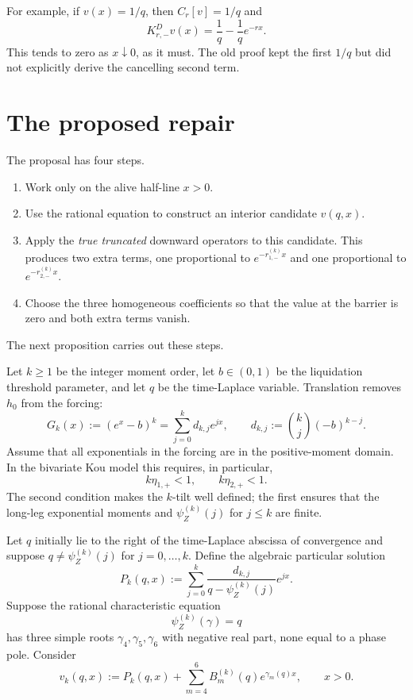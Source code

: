 \documentclass[11pt]{article}
\theoremstyle{plain}
\theoremstyle{remark}
\begin{document}
For example, if $v(x)=1/q$, then $C_r[v]=1/q$ and
\begin{equation}\label{eq:constant-truncated}
K_{r,-}^{D}v(x)=\frac1q-\frac1q e^{-rx}.
\end{equation}
This tends to zero as $x\downarrow0$, as it must.  The old proof kept the first
$1/q$ but did not explicitly derive the cancelling second term.

\section{The proposed repair}

The proposal has four steps.
\begin{enumerate}
\item Work only on the alive half-line $x>0$.
\item Use the rational equation to construct an interior candidate $v(q,x)$.
\item Apply the \emph{true truncated} downward operators to this candidate.
This produces two extra terms, one proportional to
$e^{-r_{1,-}^{(k)}x}$ and one proportional to
$e^{-r_{2,-}^{(k)}x}$.
\item Choose the three homogeneous coefficients so that the value at the
barrier is zero and both extra terms vanish.
\end{enumerate}

The next proposition carries out these steps.

Let $k\geq1$ be the integer moment order, let $b\in(0,1)$ be the liquidation
threshold parameter, and let $q$ be the time-Laplace variable.  Translation
removes $h_0$ from the forcing:
\[
G_k(x):=(e^x-b)^k
=\sum_{j=0}^k d_{k,j}e^{jx},
\qquad
d_{k,j}:=\binom{k}{j}(-b)^{k-j}.
\]
Assume that all exponentials in the forcing are in the positive-moment
domain.  In the bivariate Kou model this requires, in particular,
\begin{equation}\label{eq:moment-domain}
k\eta_{1,+}<1,
\qquad
k\eta_{2,+}<1.
\end{equation}
The second condition makes the $k$-tilt well defined; the first ensures that
the long-leg exponential moments and $\psi_Z^{(k)}(j)$ for $j\leq k$ are
finite.

Let $q$ initially lie to the right of the time-Laplace abscissa of convergence
and suppose $q\neq\psi_Z^{(k)}(j)$ for $j=0,\ldots,k$.  Define the algebraic
particular solution
\begin{equation}\label{eq:particular}
P_k(q,x):=
\sum_{j=0}^k
\frac{d_{k,j}}{q-\psi_Z^{(k)}(j)}e^{jx}.
\end{equation}
Suppose the rational characteristic equation
\[
\psi_Z^{(k)}(\gamma)=q
\]
has three simple roots $\gamma_4,\gamma_5,\gamma_6$ with negative real part,
none equal to a phase pole.  Consider
\begin{equation}\label{eq:interior-ansatz}
v_k(q,x):=P_k(q,x)+\sum_{m=4}^6B_m^{(k)}(q)e^{\gamma_m(q)x},
\qquad x>0.
\end{equation}
\end{document}
